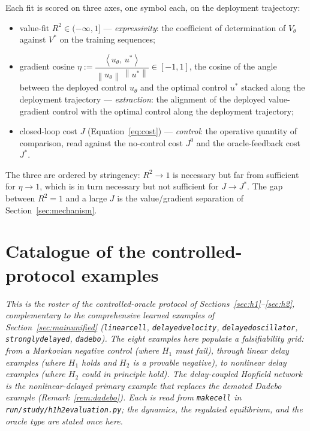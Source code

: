 \documentclass[11pt]{article}
\renewcommand{\_}{\discretionary{\textunderscore}{}{\textunderscore}}
\theoremstyle{plain}
\theoremstyle{definition}
\newcommand{\norm}[1]{\left\lVert #1 \right\rVert}
\newcommand{\inner}[2]{\left\langle #1,\, #2 \right\rangle}
\begin{document}
Each fit is scored on three axes, one symbol each, on the deployment trajectory:
\begin{itemize}
\item value-fit $R^{2}\in(-\infty,1]$ --- \emph{expressivity}: the coefficient of
determination of $V_{\theta}$ against $V^{\ast}$ on the training sequences;
\item gradient cosine
$\eta:=\dfrac{\inner{u_{\theta}}{u^{\ast}}}{\norm{u_{\theta}}\,\norm{u^{\ast}}}\in[-1,1]$, the
cosine of the angle between the deployed control $u_{\theta}$ and the optimal control $u^{\ast}$
stacked along the deployment trajectory ---
\emph{extraction}: the alignment of the deployed value-gradient control with the optimal
control along the deployment trajectory;
\item closed-loop cost $J$ (Equation~\eqref{eq:cost}) --- \emph{control}: the operative
quantity of comparison, read against the no-control cost $J^{0}$ and the oracle-feedback cost
$J^{\ast}$.
\end{itemize}
The three are ordered by stringency: $R^{2}\to1$ is necessary but far from sufficient for
$\eta\to1$, which is in turn necessary but not sufficient for $J\to J^{\ast}$. The gap between
$R^{2}=1$ and a large $J$ is the value/gradient separation of Section~\ref{sec:mechanism}.

\section{Catalogue of the controlled-protocol examples}\label{sec:catalogue}

\emph{This is the roster of the controlled-oracle protocol of
Sections~\ref{sec:h1}--\ref{sec:h2}, complementary to the comprehensive learned examples of
Section~\ref{sec:mainunified} (\texttt{linear\_cell}, \texttt{delayed\_velocity},
\texttt{delayed\_oscillator}, \texttt{strongly\_delayed}, \texttt{dadebo}). The eight examples here
populate a falsifiability grid: from a Markovian negative control (where $H_1$ must fail),
through linear delay examples (where $H_1$ holds and $H_2$ is a provable negative), to nonlinear
delay examples (where $H_2$ could in principle hold). The delay-coupled Hopfield network is the
nonlinear-delayed primary example that replaces the demoted Dadebo example
(Remark~\ref{rem:dadebo}). Each is read from \texttt{make\_cell} in
\texttt{run/study/h1h2\_evaluation.py}; the dynamics, the regulated equilibrium, and the oracle
type are stated once here.}
\end{document}
